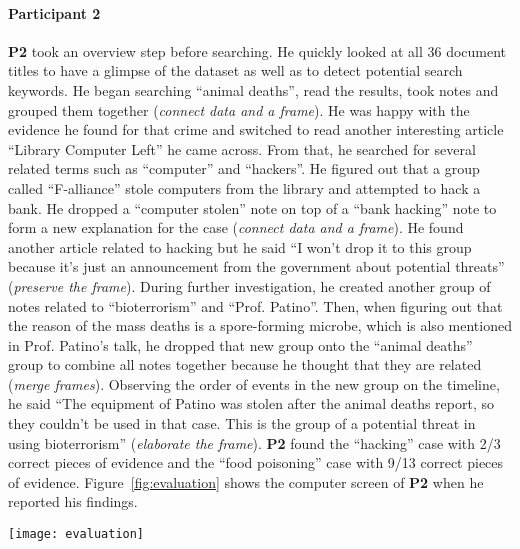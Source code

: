 \paragraph{Participant 2}
\textbf{P2} took an overview step before searching. He quickly looked at all 36 document titles to have a glimpse of the dataset as well as to detect potential search keywords. He began searching ``animal deaths'', read the results, took notes and grouped them together (\emph{connect data and a frame}). He was happy with the evidence he found for that crime and switched to read another interesting article ``Library Computer Left'' he came across. From that, he searched for several related terms such as ``computer'' and ``hackers''. He figured out that a group called ``F-alliance'' stole computers from the library and attempted to hack a bank. He dropped a ``computer stolen'' note on top of a ``bank hacking'' note to form a new explanation for the case (\emph{connect data and a frame}). He found another article related to hacking but he said ``I won't drop it to this group because it's just an announcement from the government about potential threats'' (\emph{preserve the frame}). During further investigation, he created another group of notes related to ``bioterrorism'' and ``Prof. Patino''. Then, when figuring out that the reason of the mass deaths is a spore-forming microbe, which is also mentioned in Prof. Patino's talk, he dropped that new group onto the ``animal deaths'' group to combine all notes together because he thought that they are related (\emph{merge frames}). Observing the order of events in the new group on the timeline, he said ``The equipment of Patino was stolen after the animal deaths report, so they couldn't be used in that case. This is the group of a potential threat in using bioterrorism'' (\emph{elaborate the frame}). \textbf{P2} found the ``hacking'' case with 2/3 correct pieces of evidence and the ``food poisoning'' case with 9/13 correct pieces of evidence. Figure~\ref{fig:evaluation} shows the computer screen of \textbf{P2} when he reported his findings.

\begin{figure*}[!htb]
	\centering
	\texttt{[image: evaluation]}
	\caption{Final screen of participant \textbf{P2}. Top: a trail of his keyword searches, collapsed after being read. Middle: search results in index-card metaphor. Bottom: two schemas containing notes as supporting evidence of criminal activities he found.}
	\label{fig:evaluation}
\end{figure*}

